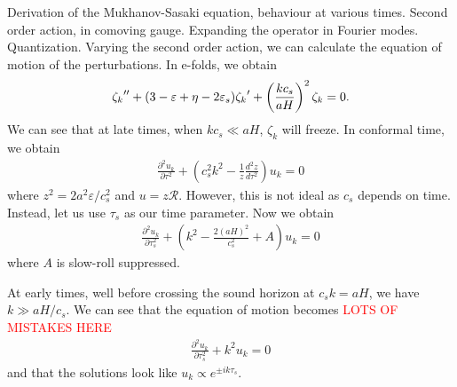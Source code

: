     Derivation of the Mukhanov-Sasaki equation, behaviour at various times.
    Second order action, in comoving gauge.
    Expanding the operator in Fourier modes.
    Quantization.
    Varying the second order action, we can calculate the equation of motion
    of the perturbations.
    In e-folds, we obtain
    \begin{align}\label{modefneqn_zeta_N}
        {\zeta_k}'' + (3-\varepsilon+\eta-2\varepsilon_{s}){\zeta_k}'+\left(\frac{kc_s}{aH}\right)^2\zeta_k=0.
    \end{align}
    We can see that at late times, when $kc_s\ll aH$, $\zeta_k$ will freeze.
    In conformal time, we obtain
    \begin{align}\label{modefneqn_tau}
        \frac{\partial^2 u_k}{\partial \tau^2} + \left(c_s^2k^2 - \frac{1}{z}\frac{d^2 z}{d \tau^2}\right)u_k = 0
    \end{align}
    where $z^2 = 2a^2\varepsilon/c_s^2$ and $u=z\mathcal{R}$.
    However, this is not ideal as $c_s$ depends on time.
    Instead, let us use $\tau_s$ as our time parameter.
    Now we obtain~\cite{Hu_2011}
    \begin{align}\label{modefneqn_tau_s}
        \frac{\partial^2 u_k}{\partial \tau_s^2} + \left(k^2 - \frac{2\left(aH\right)^2}{c_s^2}+A\right)u_k = 0
    \end{align}
    where $A$ is slow-roll suppressed.


    At early times, well before crossing the sound horizon at $c_sk=aH$,
    we have $k\gg aH/c_s$. We can see that the equation of motion becomes
    \textcolor{red}{LOTS OF MISTAKES HERE}
    \begin{align}
        \frac{\partial^2 u_k}{\partial \tau_s^2} + k^2 u_k = 0
    \end{align}
    and that the solutions look like $u_k\propto e^{\pm ik\tau_s}$.


